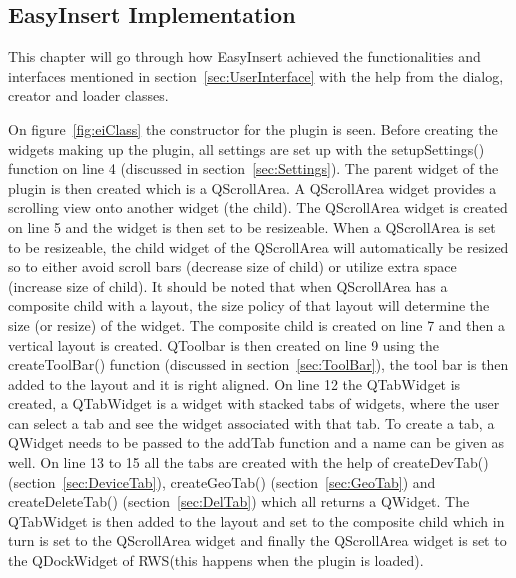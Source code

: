 \subsection{EasyInsert Implementation}
This chapter will go through how EasyInsert achieved the functionalities and interfaces mentioned in section~\ref{sec:UserInterface} with the help from the dialog, creator and loader classes. 

On figure~\ref{fig:eiClass} the constructor for the plugin is seen. Before creating the widgets making up the plugin, all settings are set up with the setupSettings() function on line 4 (discussed in section~\ref{sec:Settings}). The parent widget of the plugin is then created which is a QScrollArea. A QScrollArea widget provides a scrolling view onto another widget (the child). The QScrollArea widget is created on line 5 and the widget is then set to be resizeable. When a QScrollArea is set to be resizeable, the child widget of the QScrollArea will automatically be resized so to either avoid scroll bars (decrease size of child) or utilize extra space (increase size of child). It should be noted that when QScrollArea has a composite child with a layout, the size policy of that layout will determine the size (or resize) of the widget. The composite child is created on line 7 and then a vertical layout is created. QToolbar is then created on line 9 using the createToolBar() function (discussed in section~\ref{sec:ToolBar}), the tool bar is then added to the layout and it is right aligned. On line 12 the QTabWidget is created, a QTabWidget is a widget with stacked tabs of widgets, where the user can select a tab and see the widget associated with that tab. To create a tab, a QWidget needs to be passed to the addTab function and a name can be given as well. On line 13 to 15 all the tabs are created with the help of createDevTab() (section~\ref{sec:DeviceTab}), createGeoTab() (section~\ref{sec:GeoTab}) and createDeleteTab() (section~\ref{sec:DelTab}) which all returns a QWidget. The QTabWidget is then added to the layout and set to the composite child which in turn is set to the QScrollArea widget and finally the QScrollArea widget is set to the QDockWidget of RWS(this happens when the plugin is loaded). 


